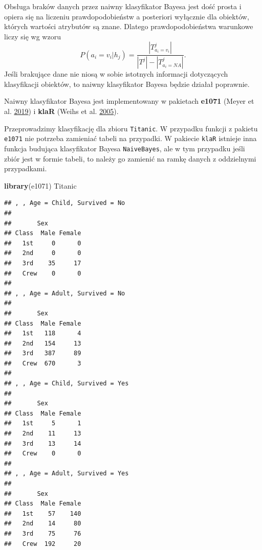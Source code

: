 \documentclass[]{book}
\newenvironment{Shaded}{\begin{snugshade}}{\end{snugshade}}
\newcommand{\DataTypeTok}[1]{\textcolor[rgb]{0.13,0.29,0.53}{#1}}
\newcommand{\KeywordTok}[1]{\textcolor[rgb]{0.13,0.29,0.53}{\textbf{#1}}}
\newcommand{\NormalTok}[1]{#1}
\newcommand{\OperatorTok}[1]{\textcolor[rgb]{0.81,0.36,0.00}{\textbf{#1}}}
\newcommand{\StringTok}[1]{\textcolor[rgb]{0.31,0.60,0.02}{#1}}
\theoremstyle{plain}
\theoremstyle{definition}
\theoremstyle{definition}
\theoremstyle{definition}
\theoremstyle{definition}
\theoremstyle{remark}
\let\BeginKnitrBlock\begin \let\EndKnitrBlock\end
\begin{document}
Obsługa braków danych przez naiwny klasyfikator Bayesa jest dość prosta i opiera się na liczeniu prawdopodobieństw a posteriori wyłącznie dla obiektów, których wartości atrybutów są znane. Dlatego prawdopodobieństwa warunkowe liczy się wg wzoru
\begin{equation}\label{pr_war}
        P(a_i=v_i|h_j)=\frac{|T^j_{a_i=v_i}|}{|T^j|-|T^j_{a_i=NA}|}.
\end{equation}
Jeśli brakujące dane nie niosą w sobie istotnych informacji dotyczących klasyfikacji obiektów, to naiwny klasyfikator Bayesa będzie działał poprawnie.

Naiwny klasyfikator Bayesa jest implementowany w pakietach \textbf{e1071} (Meyer et al. \protect\hyperlink{ref-R-e1071}{2019}) i \textbf{klaR} (Weihs et al. \protect\hyperlink{ref-R-klaR}{2005}).

\BeginKnitrBlock{example}
\protect\hypertarget{exm:unnamed-chunk-74}{}{\label{exm:unnamed-chunk-74} }Przeprowadzimy klasyfikację dla zbioru \texttt{Titanic}. W przypadku funkcji z pakietu \texttt{e1071} nie potrzeba zamieniać tabeli na przypadki. W pakiecie \texttt{klaR} istnieje inna funkcja budująca klasyfikator Bayesa \texttt{NaiveBayes}, ale w tym przypadku jeśli zbiór jest w formie tabeli, to należy go zamienić na ramkę danych z oddzielnymi przypadkami.
\EndKnitrBlock{example}

\begin{Shaded}
\begin{Highlighting}[]
\KeywordTok{library}\NormalTok{(e1071)}
\NormalTok{Titanic}
\end{Highlighting}
\end{Shaded}

\begin{verbatim}
## , , Age = Child, Survived = No
## 
##       Sex
## Class  Male Female
##   1st     0      0
##   2nd     0      0
##   3rd    35     17
##   Crew    0      0
## 
## , , Age = Adult, Survived = No
## 
##       Sex
## Class  Male Female
##   1st   118      4
##   2nd   154     13
##   3rd   387     89
##   Crew  670      3
## 
## , , Age = Child, Survived = Yes
## 
##       Sex
## Class  Male Female
##   1st     5      1
##   2nd    11     13
##   3rd    13     14
##   Crew    0      0
## 
## , , Age = Adult, Survived = Yes
## 
##       Sex
## Class  Male Female
##   1st    57    140
##   2nd    14     80
##   3rd    75     76
##   Crew  192     20
\end{verbatim}

\begin{Shaded}
\end{Shaded}
\end{document}
